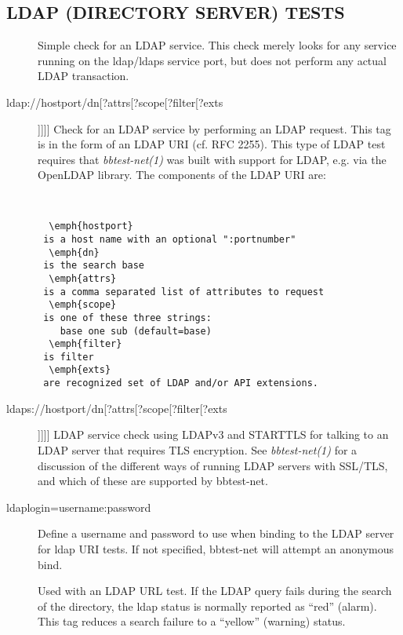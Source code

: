 \subsection{LDAP (DIRECTORY SERVER) TESTS}
\begin{description}
\item[]
\item[] Simple check for an LDAP service. This check merely looks
  for any service running on the ldap/ldaps service port, but does not
  perform any actual LDAP transaction. 

\item[ldap://hostport/dn[?attrs[?scope[?filter[?exts]]]]] Check for an
  LDAP service by performing an LDAP request. This tag is in the form
  of an LDAP URI (cf. RFC 2255). This type of LDAP test requires that
  \emph{bbtest-net(1)} was built with support for LDAP, e.g. via the
  OpenLDAP library. The components of the LDAP URI are:
  \begin{verbatim}


  \emph{hostport}
 is a host name with an optional ":portnumber"
  \emph{dn}
 is the search base
  \emph{attrs}
 is a comma separated list of attributes to request
  \emph{scope}
 is one of these three strings:
    base one sub (default=base)
  \emph{filter}
 is filter
  \emph{exts}
 are recognized set of LDAP and/or API extensions.

\end{verbatim}


 

\item[ldaps://hostport/dn[?attrs[?scope[?filter[?exts]]]]] LDAP
  service check using LDAPv3 and STARTTLS for talking to an LDAP
  server that requires TLS encryption. See \emph{bbtest-net(1)} for a
  discussion of the different ways of running LDAP servers with
  SSL/TLS, and which of these are supported by bbtest-net. 


 

\item[ldaplogin=username:password] Define a username and password to
  use when binding to the LDAP server for ldap URI tests. If not
  specified, bbtest-net will attempt an anonymous bind. 


 

\item[] Used with an LDAP URL test. If the LDAP query
  fails during the search of the directory, the ldap status is
  normally reported as ``red'' (alarm). This tag reduces a search
  failure to a ``yellow'' (warning) status. 


 


\end{description}
